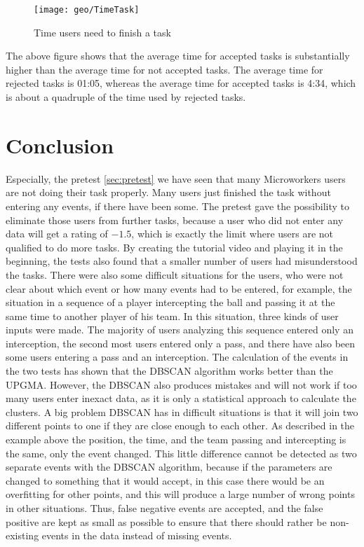 \begin{figure}[H]
    \centering
    \texttt{[image: geo/TimeTask]}
    \caption{Time users need to finish a task}
\end{figure}

The above figure shows that the average time for accepted tasks is substantially higher than the average time for not accepted tasks.
The average time for rejected tasks is 01:05, whereas the average time for accepted tasks is 4:34, which is about a quadruple of the time used by rejected tasks.





\newpage
\section{Conclusion}

Especially, the pretest \ref{sec:pretest} we have seen that many Microworkers users are not doing their task properly. Many users just finished the task without entering any events, if there have been some.
The pretest gave the possibility to eliminate those users from further tasks, because a user who did not enter any data will get a rating of $-1.5$, which is exactly the limit where users are not qualified to do more tasks.
\newline
By creating the tutorial video and playing it in the beginning, the tests also found that a smaller number of users had misunderstood the tasks.
\newline
There were also some difficult situations for the users, who were not clear about which event or how many events had to be entered, for example, the situation in a sequence of a player intercepting the ball and passing it at the same time to another player of his team. In this situation, three kinds of user inputs were made. The majority of users analyzing this sequence entered only an interception, the second most users entered only a pass, and there have also been some users entering a pass and an interception.
\newline
The calculation of the events in the two tests has shown that the DBSCAN algorithm works better than the UPGMA. However, the DBSCAN also produces mistakes and will not work if too many users enter inexact data, as it is only a statistical approach to calculate the clusters.
A big problem DBSCAN has in difficult situations is that it will join two different points to one if they are close enough to each other. As described in the example above the position, the time, and the team passing and intercepting is the same, only the event changed. This little difference cannot be detected as two separate events with the DBSCAN algorithm, because if the parameters are changed to something that it would accept, in this case there would be an overfitting for other points, and this will produce a large number of wrong points in other situations. Thus, false negative events are accepted, and the false positive are kept as small as possible to ensure that there should rather be non-existing events in the data instead of missing events.



